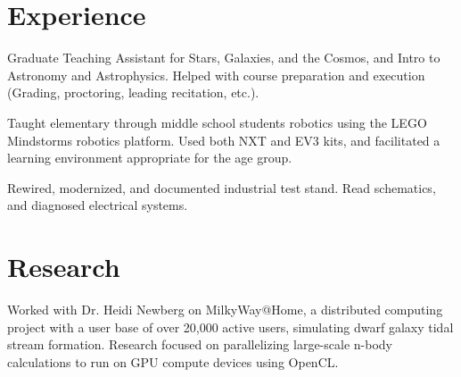 \documentclass[letterpaper]{deedy-resume} %
\begin{document}
\hfill
%
%
\begin{minipage}[t]{0.66\textwidth} %


\section{Experience}

Graduate Teaching Assistant for Stars, Galaxies, and the Cosmos, and Intro to Astronomy and Astrophysics. Helped with course
preparation and execution (Grading, proctoring, leading recitation, etc.).



Taught elementary through middle school students robotics using the LEGO
Mindstorms robotics platform. Used both NXT and EV3 kits, and facilitated a learning
environment appropriate for the age group.



Rewired, modernized, and documented industrial test stand. Read schematics, and
diagnosed electrical systems.


\section{Research}


Worked with Dr. Heidi Newberg on MilkyWay@Home, a distributed computing
project with a user base of over 20,000 active users, simulating dwarf galaxy tidal
stream formation. Research focused on parallelizing large-scale n-body calculations
to run on GPU compute devices using OpenCL.


\end{minipage}
\end{document}

